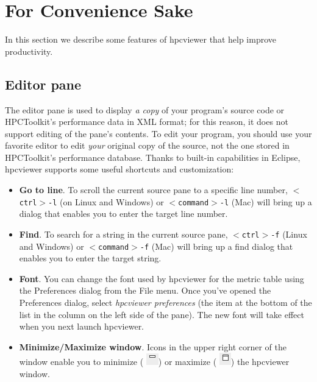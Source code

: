 \documentclass[a4paper,11pt]{article}
\begin{document}
\section{For Convenience Sake}

In this section we describe some features of hpcviewer that help  improve productivity. 

\subsection{Editor pane}

 The editor pane is used to display \textit{a copy} of your program's  source code or HPCToolkit's performance data in XML format; for this  reason, it does not support editing of the pane's contents. To edit your program, you should use your favorite editor to edit  \textit{your} original copy of the source, not the one stored in HPCToolkit's  performance database. Thanks to built-in capabilities in Eclipse,  hpcviewer supports some useful shortcuts and customization:   
\begin{itemize}
	\item \textbf{Go to line}. To scroll the current source pane to a specific line   number, 
\texttt{$<$ctrl$>$-l} (on Linux and Windows) or   
\texttt{$<$command$>$-l} (Mac) will bring up a dialog that   enables you to enter the target line number.
	\item \textbf{Find}. To search for a string in the current source pane,   
\texttt{$<$ctrl$>$-f} (Linux and Windows) or   
\texttt{$<$command$>$-f} (Mac) will bring up a find dialog   that enables you to enter the target string.
	\item \textbf{Font}. You can change the font used by hpcviewer for the   metric table using the Preferences dialog from the File menu. Once   you've opened the Preferences dialog, select \textit{hpcviewer   preferences} (the item at the bottom of the list in the column on   the left side of the pane). The new font will take effect when you   next launch hpcviewer.   
	\item \textbf{Minimize/Maximize window}. Icons in the upper right corner   of the window enable you to minimize (
\includegraphics{images/Minimize.png})   or maximize (
\includegraphics{images/Maximize.png}) the hpcviewer window. 
\end{itemize}
\end{document}
